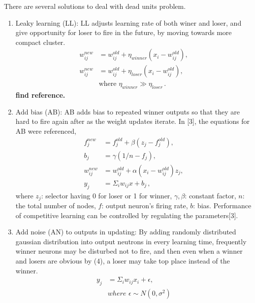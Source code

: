 \documentclass[12pt,a4paper]{report}
\begin{document}
\bigskip
There are several solutions to deal with dead units problem. 

\begin{enumerate}
\item Leaky learning (LL): LL adjusts learning rate of both winer and loser, and give opportunity for loser to fire in the future, by moving towards more compact cluster.
\begin{equation} \label{eq6}
\begin{split}
w_{ij}^{new} & = w_{ij}^{old} + \eta_{winner} (x_i - w_{ij}^{old}), \\
w_{ij}^{new} & = w_{ij}^{old} + \eta_{loser} (x_i - w_{ij}^{old}), \\
& \text{where } \eta_{winner} \gg \eta_{loser} \, .
\end{split}
\end{equation}
\textbf{find reference.}

\item Add bias (AB): AB adds bias to repeated winner outputs so that they are hard to fire again after as the weight updates iterate. In [3], the equations for AB were referenced,
\begin{equation} \label{eq7}
\begin{split}
f_j^{new} & = f_j^{old} + \beta (z_j - f_j^{old}), \\
b_j & = \gamma (1/n - f_j), \\
w_{ij}^{new} & = w_{ij}^{old} + \alpha (x_i - w_{ij}^{old}) z_j,\\
y_j & = \Sigma_i w_{ij} x + b_j \, ,
\end{split}
\end{equation}
where $z_j$: selector having 0 for loser or 1 for winner, $\gamma, \beta$: constant factor, $n$: the total number of nodes, $f$: output neuron's firing rate, $b$: bias. Performance of competitive learning can be controlled by regulating the parameters[3].

\item Add noise (AN) to outputs in updating: By adding randomly distributed gaussian distribution into output neutrons in every learning time, frequently winner neurons may be disturbed not to fire, and then even when a winner and losers are obvious by (4), a loser may take top place instead of the winner.
\begin{equation} \label{eq8}
\begin{split}
y_j & = \Sigma_{i}w_{ij}x_i + \epsilon, \\
& where \,\, \epsilon \sim N(0, \sigma^2)
\end{split}
\end{equation}


\end{enumerate}
\end{document}

